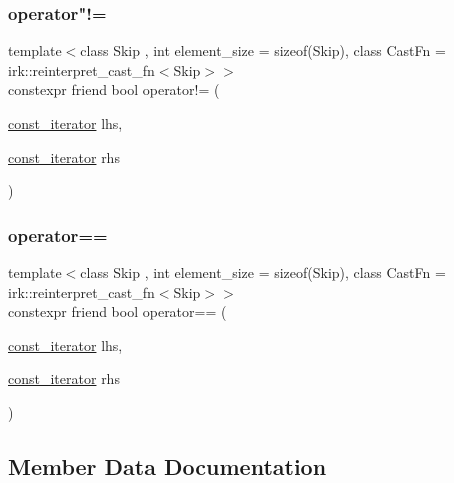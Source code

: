 \subsubsection{\texorpdfstring{operator"!=}{operator!=}}
{\footnotesize\ttfamily template$<$class Skip , int element\+\_\+size = sizeof(\+Skip), class Cast\+Fn  = irk\+::reinterpret\+\_\+cast\+\_\+fn$<$\+Skip$>$$>$ \\
constexpr friend bool operator!= (\begin{DoxyParamCaption}\item[{\mbox{\hyperlink{structirk_1_1index_1_1skip__list__view_1_1const__iterator}{const\+\_\+iterator}}}]{lhs,  }\item[{\mbox{\hyperlink{structirk_1_1index_1_1skip__list__view_1_1const__iterator}{const\+\_\+iterator}}}]{rhs }\end{DoxyParamCaption})\hspace{0.3cm}{\ttfamily [friend]}}

\mbox{\label{structirk_1_1index_1_1skip__list__view_1_1const__iterator_a665f31dd0863021bd6b740d244346aeb}} 
\subsubsection{\texorpdfstring{operator==}{operator==}}
{\footnotesize\ttfamily template$<$class Skip , int element\+\_\+size = sizeof(\+Skip), class Cast\+Fn  = irk\+::reinterpret\+\_\+cast\+\_\+fn$<$\+Skip$>$$>$ \\
constexpr friend bool operator== (\begin{DoxyParamCaption}\item[{\mbox{\hyperlink{structirk_1_1index_1_1skip__list__view_1_1const__iterator}{const\+\_\+iterator}}}]{lhs,  }\item[{\mbox{\hyperlink{structirk_1_1index_1_1skip__list__view_1_1const__iterator}{const\+\_\+iterator}}}]{rhs }\end{DoxyParamCaption})\hspace{0.3cm}{\ttfamily [friend]}}



\subsection{Member Data Documentation}
\mbox{\label{structirk_1_1index_1_1skip__list__view_1_1const__iterator_a6e3df1b2579be0c2162535f45a65b000}} 
